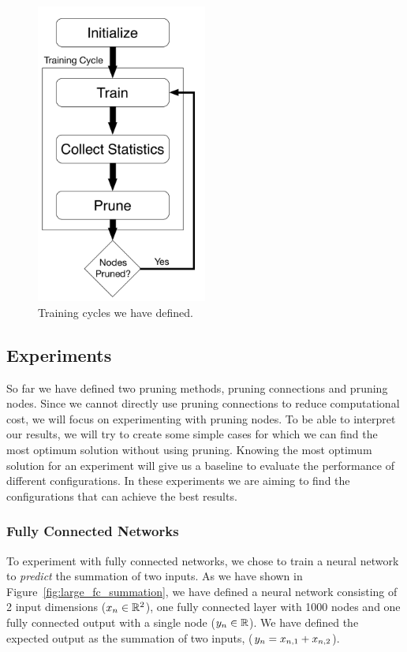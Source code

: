\begin{figure}[!h]
  \begin{center}
  \includegraphics[width=0.5\textwidth]{images/training_cycle}
  \end{center}
  \caption{Training cycles we have defined.}
  \label{fig:training_cycles}
\end{figure}

\subsection{Experiments}
So far we have defined two pruning methods, pruning connections and pruning nodes. Since we cannot directly use pruning connections to reduce computational cost, we will focus on experimenting with pruning nodes. To be able to interpret our results, we will try to create some simple cases for which we can find the most optimum solution without using pruning. Knowing the most optimum solution for an experiment will give us a baseline to evaluate the performance of different configurations. In these experiments we are aiming to find the configurations that can achieve the best results.

\subsubsection{Fully Connected Networks}
To experiment with fully connected networks, we chose to train a neural network to \textit{predict} the summation of two inputs. As we have shown in Figure~\ref{fig:large_fc_summation}, we have defined a neural network consisting of 2 input dimensions ($x_{n} \in \mathbb{R}^{2}$), one fully connected layer with 1000 nodes and one fully connected output with a single node ($y_{n} \in \mathbb{R}$). We have defined the expected output as the summation of two inputs, ($y_{n} = x_{n,1} + x_{n,2}$). 

